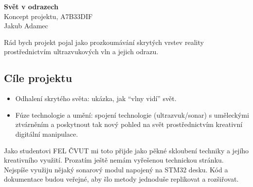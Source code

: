 \documentclass[11pt,a4paper]{article}
\begin{document}
    \begin{center}
        \Huge \textbf{Svět v odrazech} \\ 
        \normalsize Koncept projektu, A7B33DIF \\
        Jakub Adamec
    \end{center}

    Rád bych projekt pojal jako prozkoumávání skrytých vrstev reality prostřednictvím ultrazvukových vln a 
    jejich odrazu.

    \subsection*{Cíle projektu}
    \begin{itemize}
        \item Odhalení skrytého světa: ukázka, jak \enquote{vlny vidí} svět.
        \item Fúze technologie a umění: spojení technologie (ultrazvuk/sonar) s uměleckými ztvárněním a 
        poskytnout tak nový pohled na svět prostřednictvím kreativní digitální manipulace.
    \end{itemize}

    Jako studentovi FEL ČVUT mi toto přijde jako pěkné skloubení techniky a jejího kreativního využití.
    Prozatím ještě nemám vyřešenou technickou stránku. Nejspíše využiju nějaký sonarový modul napojený na STM32 desku. 
    Kód a dokumentace budou veřejné, aby šlo metody jednoduše replikovat a rozšiřovat.
\end{document}
